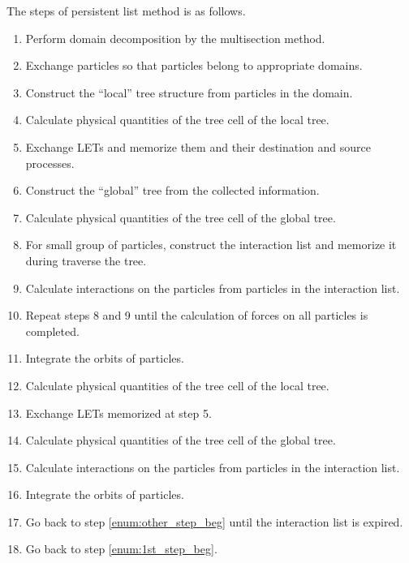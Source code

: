 \documentclass[]{pasj01}
\begin{document}
The steps of persistent list method is as follows.

\begin{enumerate}

\item Perform domain decomposition by the multisection method. \label{enum:1st_step_beg}
  
\item Exchange particles so that particles belong to appropriate
  domains.
  
\item Construct the ``local'' tree structure from particles in the
  domain.

\item Calculate physical quantities of the tree cell of the local
  tree.
  
\item Exchange LETs and memorize them and their destination and source
  processes. \label{enum:LET}
    
\item Construct the ``global'' tree from the collected information.

\item Calculate physical quantities of the tree cell of the global tree.
  
\item For small group of particles, construct the interaction list and
  memorize it during traverse the tree.
  
\item Calculate interactions on the particles from particles in the
  interaction list.

\item Repeat steps 8 and 9 until the calculation of forces on all
  particles is completed.
  
\item Integrate the orbits of particles. \label{enum:1st_step_end}
  
\item Calculate physical quantities of the tree cell of the local tree. \label{enum:other_step_beg}

\item Exchange LETs memorized at step 5.

\item Calculate physical quantities of the tree cell of the global
  tree.

\item Calculate interactions on the particles from particles in the
  interaction list.

\item Integrate the orbits of particles. \label{enum:other_step_end}
    
\item Go back to step \ref{enum:other_step_beg} until the interaction
  list is expired.
    
\item Go back to step \ref{enum:1st_step_beg}.
  
\end{enumerate}
\end{document}
